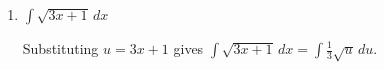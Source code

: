 \documentclass{article}
\begin{document}
\begin{enumerate}
\begin{enumerate}
      \begin{solution}
        Substituting $u = e^{2x} + 1$ gives $\displaystyle \int e^{2x}
        \sqrt{e^{2x} + 1}\,dx = \int \frac{1}{2} \sqrt{u}\,du$.
      \end{solution}

    \item
      \begin{problem}
        $\displaystyle \int \sqrt{3x + 1}\,dx$
      \end{problem}

      \begin{solution}
        Substituting $u = 3x + 1$ gives $\displaystyle \int \sqrt{3x +
          1}\,dx = \int \frac{1}{3} \sqrt{u}\,du$.
      \end{solution}

    \end{enumerate}    
    \probonly{}

\end{enumerate}

\end{document}
